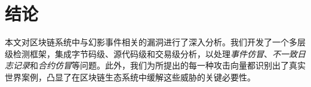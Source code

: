 \section{结论}

本文对区块链系统中与幻影事件相关的漏洞进行了深入分析。我们开发了一个多层级检测框架，集成字节码级、源代码级和交易级分析，以处理\emph{事件仿冒}、\emph{不一致日志记录}和\emph{合约仿冒}等问题。此外，我们为所提出的每一种攻击向量都识别出了真实世界案例，凸显了在区块链生态系统中缓解这些威胁的关键必要性。
